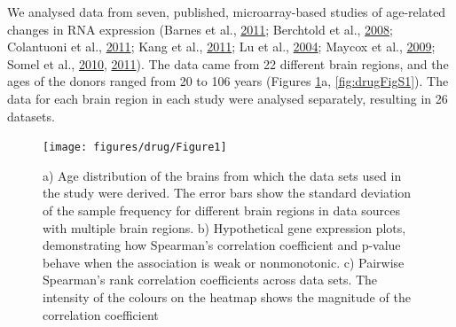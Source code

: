 \documentclass[12pt,twoside]{unicam}
\begin{document}
We analysed data from seven, published, microarray-based studies of age-related changes in RNA expression (Barnes et al., \protect\hyperlink{ref-Barnes2011}{2011}; Berchtold et al., \protect\hyperlink{ref-Berchtold2008}{2008}; Colantuoni et al., \protect\hyperlink{ref-Colantuoni2011}{2011}; Kang et al., \protect\hyperlink{ref-Kang2011}{2011}; Lu et al., \protect\hyperlink{ref-Lu2004}{2004}; Maycox et al., \protect\hyperlink{ref-Maycox2009}{2009}; Somel et al., \protect\hyperlink{ref-Somel2010}{2010}, \protect\hyperlink{ref-Somel2011}{2011}). The data came from 22 different brain regions, and the ages of the donors ranged from 20 to 106 years (Figures \ref{fig:drugFig1}a, \ref{fig:drugFigS1}). The data for each brain region in each study were analysed separately, resulting in 26 datasets.

\begin{figure}

{\centering \texttt{[image: figures/drug/Figure1]} 

}

\caption[a) Age distribution of the samples. b) Hypothetical gene expression plots demonstrating the method. c) Pairwise correlation plot across datasets.]{a) Age distribution of the brains from which the data sets used in the study were derived. The error bars show the standard deviation of the sample frequency for different brain regions in data sources with multiple brain regions. b) Hypothetical gene expression plots, demonstrating how Spearman's correlation coefficient and p-value behave when the association is weak or nonmonotonic. c) Pairwise Spearman's rank correlation coefficients across data sets. The intensity of the colours on the heatmap shows the magnitude of the correlation coefficient}\label{fig:drugFig1}
\end{figure}
\end{document}
